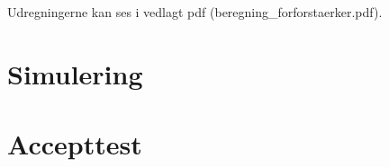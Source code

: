 Udregningerne kan ses i vedlagt pdf (beregning_forforstaerker.pdf). 


\section{Simulering}


\section{Accepttest}

